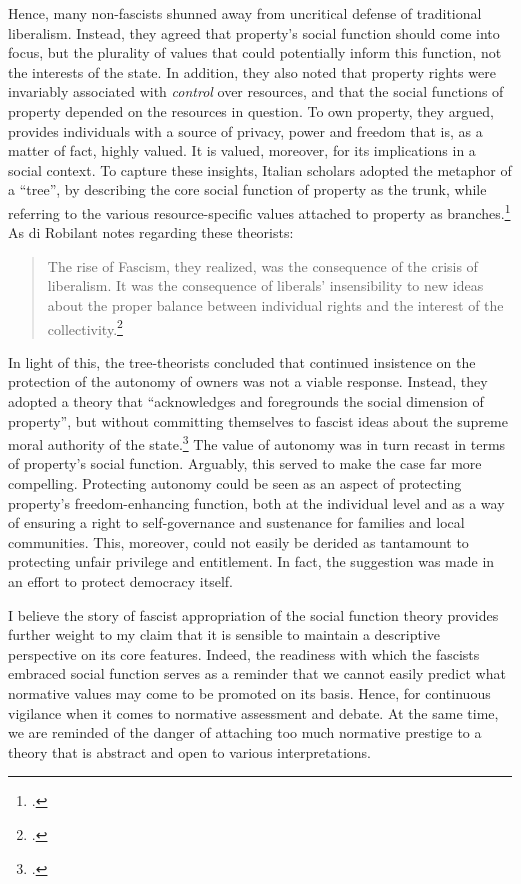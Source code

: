 Hence, many non-fascists shunned away from uncritical defense of traditional liberalism. Instead, they agreed that property's social function should come into focus, but  the plurality of values that could potentially inform this function, not the interests of the state. In addition, they also noted that property rights were invariably associated with {\it control} over resources, and that the social functions of property depended on the resources in question. To own property, they argued, provides individuals with a source of privacy, power and freedom that is, as a matter of fact, highly valued. It is valued, moreover, for its implications in a social context. To capture these insights, Italian scholars adopted the metaphor of a ``tree'', by describing the core social function of property as the trunk, while referring to the various resource-specific values attached to property as branches.\footcite[894-916]{robilant13} As di Robilant notes regarding these theorists:

\begin{quote}
The rise of Fascism, they realized, was the
consequence of the crisis of liberalism. It was the consequence of liberals' insensibility to new ideas about the proper balance between individual rights and the interest of the collectivity.\footcite[907]{robilant13}
\end{quote}

In light of this, the tree-theorists concluded that continued insistence on the protection of the autonomy of owners was not a viable response. Instead, they adopted a theory that ``acknowledges and foregrounds the social dimension of property'', but without committing themselves to fascist ideas about the supreme moral authority of the state.\footcite[907]{robilant13} The value of autonomy was in turn recast in terms of property's social function. Arguably, this served to make the case far more compelling. Protecting autonomy could be seen as an aspect of protecting property's freedom-enhancing function, both at the individual level and as a way of ensuring a right to self-governance and sustenance for families and local communities. This, moreover, could not easily be derided as tantamount to protecting unfair privilege and entitlement. In fact, the suggestion was made in an effort to protect democracy itself.

I believe the story of fascist appropriation of the social function theory provides further weight to my claim that it is sensible to  maintain a descriptive perspective on its core features. Indeed, the readiness with which the fascists embraced social function  serves as a reminder that we cannot easily predict what normative values may come to be promoted on its basis. Hence,  for continuous vigilance when it comes to normative assessment and debate. At the same time, we are reminded of the danger of attaching too much normative prestige to a theory that is abstract and open to various interpretations.

